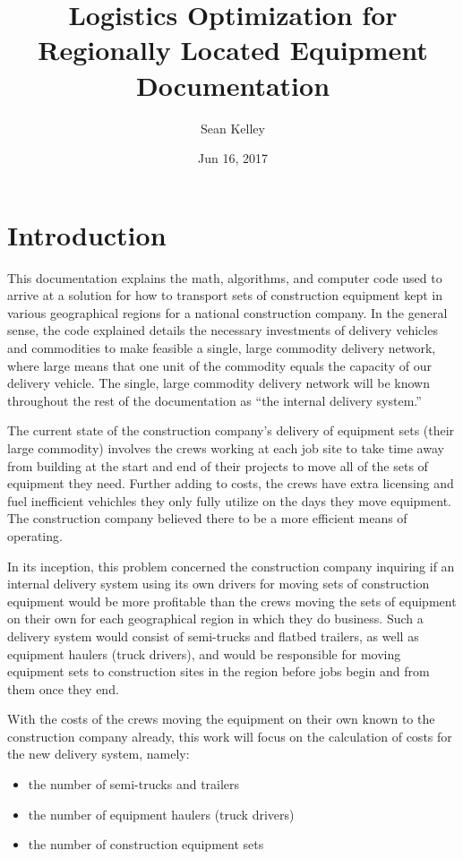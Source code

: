 \documentclass[letterpaper,10pt,english]{sphinxmanual}
\title{Logistics Optimization for Regionally Located Equipment Documentation}
\date{Jun 16, 2017}
\author{Sean Kelley}
\begin{document}
\maketitle
\sphinxtableofcontents
{}\label{\detokenize{index::doc}}



\chapter{Introduction}
\label{\detokenize{introduction:introduction}}\label{\detokenize{introduction::doc}}\label{\detokenize{introduction:contents}}\label{\detokenize{introduction:id1}}
This documentation explains the math, algorithms, and computer code used to
arrive at a solution for how to transport sets of construction equipment kept
in various geographical regions for a national construction company. In the
general sense, the code explained details the necessary investments of
delivery vehicles and commodities to make feasible a single, large commodity
delivery network, where large means that one unit of the commodity equals the
capacity of our delivery vehicle. The single, large commodity delivery network
will be known throughout the rest of the documentation as ``the internal
delivery system.''

The current state of the construction company's delivery of equipment sets
(their large commodity) involves the crews working at each job site to take time
away from building at the start and end of their projects to move all of the
sets of equipment they need. Further adding to costs, the crews have extra
licensing and fuel inefficient vehichles they only fully utilize on the days
they move equipment. The construction company believed there to be a more
efficient means of operating.

In its inception, this problem concerned the construction
company inquiring if an internal delivery system using its own drivers for
moving sets of construction equipment would be more profitable than the crews
moving the sets of equipment on their own for each geographical region in
which they do business. Such a delivery system would consist of semi-trucks
and flatbed trailers, as well as equipment haulers (truck drivers), and would
be responsible for moving equipment sets to construction sites in the region
before jobs begin and from them once they end.

With the costs of the crews moving the equipment on their own known to the
construction company already, this work will focus on the calculation of
costs for the new delivery system, namely:
\begin{itemize}
\item {} 
the number of semi-trucks and trailers

\item {} 
the number of equipment haulers (truck drivers)

\item {} 
the number of construction equipment sets

\end{itemize}
\end{document}
